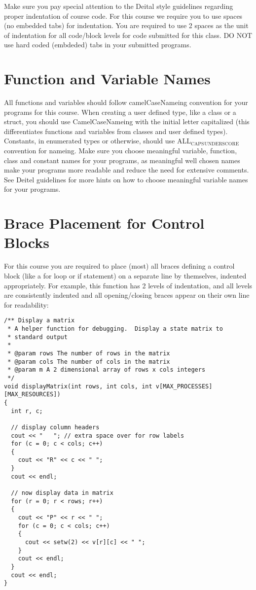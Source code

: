 \documentclass[11pt]{article}
\begin{document}
Make sure you pay special attention to the Deital style guidelines
regarding proper indentation of course code.  For this course we
require you to use spaces (no embedded tabs) for indentation.  You are
required to use 2 spaces as the unit of indentation for all code/block
levels for code submitted for this class.  DO NOT use hard coded
(embdeded) tabs in your submitted programs.
\section*{Function and Variable Names}
\label{sec-5}

All functions and variables should follow camelCaseNameing convention
for your programs for this course.  When creating a user defined type,
like a class or a struct, you should use CamelCaseNameing with the
initial letter capitalized (this differentiates functions and
variables from classes and user defined types). Constants, in
enumerated types or otherwise, should use ALL$_{\text{CAPS}}$$_{\text{UNDERSCORE}}$
convention for nameing.  Make sure you choose meaningful variable,
function, class and constant names for your programs, as meaningful
well chosen names make your programs more readable and reduce the need
for extensive comments.  See Deitel guidelines for more hints on how
to choose meaningful variable names for your programs.
\section*{Brace Placement for Control Blocks}
\label{sec-6}

For this course you are required to place (most) all braces defining a
control block (like a for loop or if statement) on a separate line by
themselves, indented appropriately.  For example, this function has 2
levels of indentation, and all levels are consistently indented and
all opening/closing braces appear on their own line for readability:

\begin{verbatim}
/** Display a matrix
 * A helper function for debugging.  Display a state matrix to
 * standard output
 *
 * @param rows The number of rows in the matrix
 * @param cols The number of cols in the matrix
 * @param m A 2 dimensional array of rows x cols integers
 */
void displayMatrix(int rows, int cols, int v[MAX_PROCESSES][MAX_RESOURCES])
{
  int r, c;

  // display column headers
  cout << "   "; // extra space over for row labels
  for (c = 0; c < cols; c++)
  {
    cout << "R" << c << " ";
  }
  cout << endl;

  // now display data in matrix
  for (r = 0; r < rows; r++)
  {
    cout << "P" << r << " ";
    for (c = 0; c < cols; c++)
    {
      cout << setw(2) << v[r][c] << " ";
    }
    cout << endl;
  }
  cout << endl;
}
\end{verbatim}
\end{document}

